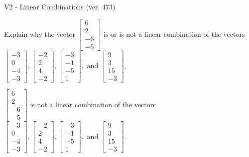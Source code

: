 \begin{exercise}
  \begin{exerciseTitle}V2 - Linear Combinations (ver. 473)\end{exerciseTitle}
  \begin{exerciseStatement}
    Explain why the vector \(\left[\begin{array}{c}
6 \\
2 \\
-6 \\
-5
\end{array}\right]\)  is or is not a linear 
	combination of the vectors \(\left[\begin{array}{c}
-3 \\
0 \\
-4 \\
-3
\end{array}\right] , \left[\begin{array}{c}
-2 \\
2 \\
4 \\
-2
\end{array}\right] , \left[\begin{array}{c}
-3 \\
-1 \\
-5 \\
1
\end{array}\right] , \text{ and } \left[\begin{array}{c}
9 \\
3 \\
15 \\
-3
\end{array}\right]\).
	


  \end{exerciseStatement}
  \begin{exerciseAnswer}
   \(\left[\begin{array}{c}
6 \\
2 \\
-6 \\
-5
\end{array}\right]\) 
  	 is not  
	a linear combination of the vectors \(\left[\begin{array}{c}
-3 \\
0 \\
-4 \\
-3
\end{array}\right] , \left[\begin{array}{c}
-2 \\
2 \\
4 \\
-2
\end{array}\right] , \left[\begin{array}{c}
-3 \\
-1 \\
-5 \\
1
\end{array}\right] , \text{ and } \left[\begin{array}{c}
9 \\
3 \\
15 \\
-3
\end{array}\right]\).


\end{exerciseAnswer}
\end{exercise}
